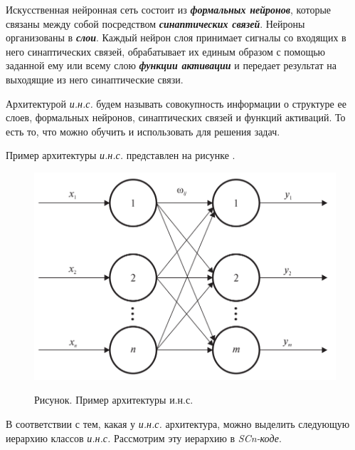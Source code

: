 Искусственная нейронная сеть состоит из \textbf{\textit{формальных нейронов}}, которые связаны между собой посредством \textbf{\textit{синаптических связей}}. Нейроны организованы в \textbf{\textit{слои}}. Каждый нейрон слоя принимает сигналы со входящих в него синаптических связей, обрабатывает их единым образом с помощью заданной ему или всему слою \textbf{\textit{функции активации}} и передает результат на выходящие из него синаптические связи.

Архитектурой \textit{и.н.с.} будем называть совокупность информации о структуре ее слоев, формальных нейронов, синаптических связей и функций активаций. То есть то, что можно обучить и использовать для решения задач.

Пример архитектуры \textit{и.н.с.} представлен на рисунке \textit{}.

\begin{figure}[H]
	\caption{Рисунок. Пример архитектуры и.н.с.}
	\includegraphics[scale=0.3]{author/part3/figures/neural_network.png}
	\label{fig:nn_example}
\end{figure}

В соответствии с тем, какая у \textit{и.н.с.} архитектура, можно выделить следующую иерархию классов \textit{и.н.с.} Рассмотрим эту иерархию в \textit{SCn-коде}.

